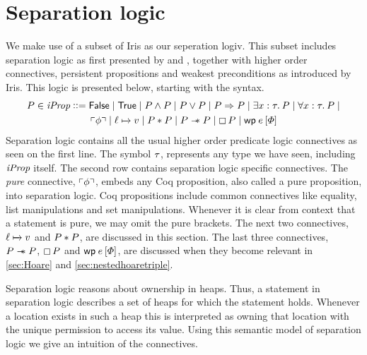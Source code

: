 \documentclass[thesis.tex]{subfiles}
\begin{document}
\section{Separation logic}
\label{sec:seplogic}
We make use of a subset of Iris \cite{jungIrisGroundModular2018} as our seperation logiv. This subset includes separation logic as first presented by  and  \cite*{ishtiaqBIAssertionLanguage2001,reynoldsSeparationLogicLogic2002}, together with higher order connectives, persistent propositions and weakest preconditions as introduced by Iris. This logic is presented below, starting with the syntax.
\begin{align*}
    \prop \in \iProp \bnfdef{} & \FALSE \mid \TRUE \mid \prop \land \prop \mid \prop \lor \prop \mid \prop \Ra \prop \mid \Exists \var:\type. \prop \mid \All \var:\type. \prop \mid \\
                               & \pure{\pprop} \mid \loc \fmapsto \val \mid \prop * \prop \mid \prop \wand \prop \mid \always\prop \mid \wpre\expr{\pred}
\end{align*}
Separation logic contains all the usual higher order predicate logic connectives as seen on the first line. The symbol $\tau$, represents any type we have seen, including $\textit{iProp}$ itself. The second row contains separation logic specific connectives. The \emph{pure} connective, $\left\ulcorner \phi \right\urcorner$, embeds any Coq proposition, also called a pure proposition, into separation logic. Coq propositions include common connectives like equality, list manipulations and set manipulations. Whenever it is clear from context that a statement is pure, we may omit the pure brackets. The next two connectives, $\loc \fmapsto \val$ and $P * P$, are discussed in this section. The last three connectives, $P \mathrel{-\!\!\ast} P$, $\mathop{\boxempty}P$ and $\wpre\expr{\pred}$, are discussed when they become relevant in \cref{sec:Hoare} and \cref{sec:nestedhoaretriple}.

Separation logic reasons about ownership in heaps. Thus, a statement in separation logic describes a set of heaps for which the statement holds. Whenever a location exists in such a heap this is interpreted as owning that location with the unique permission to access its value. Using this semantic model of separation logic we give an intuition of the connectives.
\end{document}
